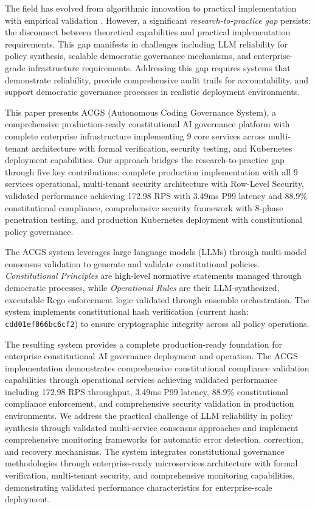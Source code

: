 \documentclass[manuscript,screen,9pt]{acmart}
\begin{document}
The field has evolved from algorithmic innovation to practical implementation with empirical validation \cite{StanfordJBLP2024AIGovernanceWeb3, StanfordLaw2025BulletProof}. However, a significant \textit{research-to-practice gap} persists: the disconnect between theoretical capabilities and practical implementation requirements. This gap manifests in challenges including LLM reliability for policy synthesis, scalable democratic governance mechanisms, and enterprise-grade infrastructure requirements. Addressing this gap requires systems that demonstrate reliability, provide comprehensive audit trails for accountability, and support democratic governance processes in realistic deployment environments.

This paper presents ACGS (Autonomous Coding Governance System), a comprehensive production-ready constitutional AI governance platform with complete enterprise infrastructure implementing 9 core services across multi-tenant architecture with formal verification, security testing, and Kubernetes deployment capabilities. Our approach bridges the research-to-practice gap through five key contributions: complete production implementation with all 9 services operational, multi-tenant security architecture with Row-Level Security, validated performance achieving 172.98 RPS with 3.49ms P99 latency and 88.9\% constitutional compliance, comprehensive security framework with 8-phase penetration testing, and production Kubernetes deployment with constitutional policy governance.

The ACGS system leverages large language models (LLMs) through multi-model consensus validation to generate and validate constitutional policies. \textit{Constitutional Principles} are high-level normative statements managed through democratic processes, while \textit{Operational Rules} are their LLM-synthesized, executable Rego enforcement logic validated through ensemble orchestration. The system implements constitutional hash verification (current hash: \texttt{cdd01ef066bc6cf2\cite{perf-report}\cite{perf-report}}) to ensure cryptographic integrity across all policy operations.

The resulting system provides a complete production-ready foundation for enterprise constitutional AI governance deployment and operation. The ACGS implementation demonstrates comprehensive constitutional compliance validation capabilities through operational services achieving validated performance including 172.98 RPS throughput, 3.49ms P99 latency, 88.9\% constitutional compliance enforcement, and comprehensive security validation in production environments. We address the practical challenge of LLM reliability in policy synthesis through validated multi-service consensus approaches and implement comprehensive monitoring frameworks for automatic error detection, correction, and recovery mechanisms. The system integrates constitutional governance methodologies through enterprise-ready microservices architecture with formal verification, multi-tenant security, and comprehensive monitoring capabilities, demonstrating validated performance characteristics for enterprise-scale deployment.
\end{document}
